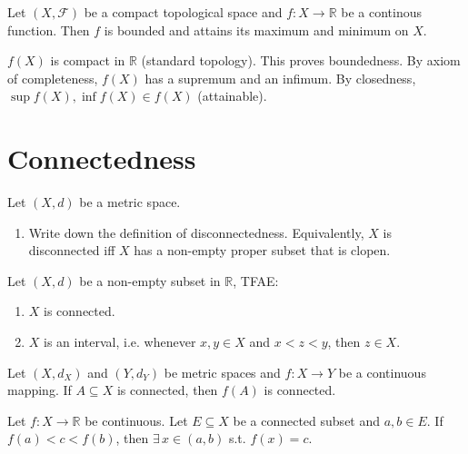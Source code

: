 \documentclass[12pt]{article}
\begin{document}
\begin{theorem}
    Let $(X,\mathcal{F})$ be a compact topological space and $f:X\rightarrow\mathbb{R}$ be a continous function. Then $f$ is bounded and attains its maximum and minimum on $X$.
\end{theorem}

\begin{pfbox}
    $f(X)$ is compact in $\mathbb{R}$ (standard topology). This proves boundedness.
    By axiom of completeness, $f(X)$ has a supremum and an infimum. By closedness, $\sup f(X), \inf f(X)\in f(X)$ (attainable).
\end{pfbox}


\section{Connectedness}

\begin{exercise}
    Let $(X, d)$ be a metric space.
    \begin{enumerate}
        \item Write down the definition of disconnectedness. Equivalently, $X$ is disconnected iff $X$ has a non-empty proper subset that is clopen.
    \end{enumerate}
\end{exercise}



\begin{theorem}
    Let $(X,d)$ be a non-empty subset in $\mathbb{R}$, TFAE:
    \begin{enumerate}
        \item $X$ is connected.
        \item $X$ is an interval, i.e. whenever $x,y\in X$ and $x<z<y$, then $z\in X$.
    \end{enumerate}
\end{theorem}

\begin{theorem}
    Let $(X,d_X)$ and $(Y,d_Y)$ be metric spaces and $f:X\rightarrow Y$ be a continuous mapping.
    If $A\subseteq X$ is connected, then $f(A)$ is connected.
\end{theorem}


\begin{theorem}
    Let $f:X\rightarrow \mathbb{R}$ be continuous. Let $E\subseteq X$ be a connected subset and $a,b\in E$. If $f(a)<c<f(b)$, then $\exists\, x\in (a,b)$ s.t. $f(x)=c$.
\end{theorem}
\end{document}
